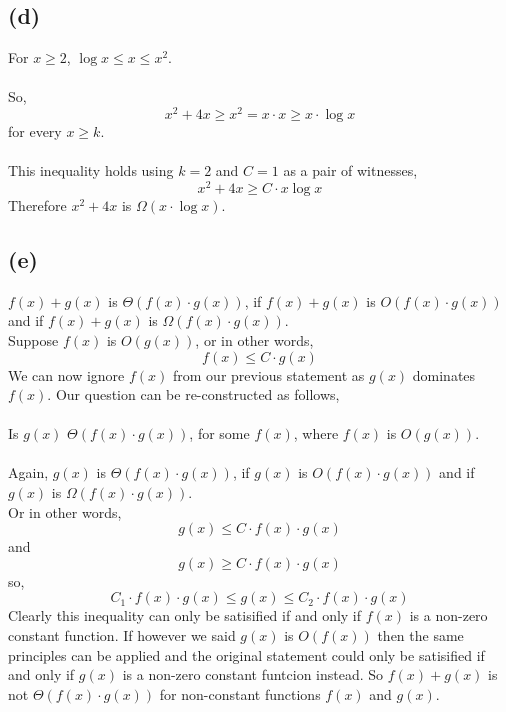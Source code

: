 \documentclass[]{article}
\begin{document}
\subsection*{(d)}
For $x \geq 2$, $\log x \leq x \leq x^2$.
\\
\\
So,
$$x^2+4x \geq x^2 = x \cdot x \geq x \cdot \log x$$
for every $x \geq k$.
\\
\\
This inequality holds using $k = 2$ and $C = 1$ as a pair of witnesses,
$$x^2+4x \geq C \cdot x \log x$$
Therefore $x^2+4x$ is $\Omega (x \cdot \log x)$.
\subsection*{(e)}
$f(x)+g(x)$ is $\Theta (f(x) \cdot g(x))$, if $f(x)+g(x)$ is $O(f(x) \cdot g(x))$ and if $f(x)+g(x)$ is $\Omega (f(x) \cdot g(x))$.
\\
Suppose $f(x)$ is $O(g(x))$, or in other words, 
$$ f(x) \leq C \cdot g(x)$$
We can now ignore $f(x)$ from our previous statement as $g(x)$ dominates $f(x)$. Our question can be re-constructed as follows,
\\
\\
Is $g(x)$ $\Theta (f(x) \cdot g(x))$, for some $f(x)$, where $f(x)$ is $O(g(x))$.
\\
\\
Again, $g(x)$ is $\Theta (f(x) \cdot g(x))$, if $g(x)$ is $O(f(x) \cdot g(x))$ and if $g(x)$ is $\Omega (f(x) \cdot g(x))$. 
\\
Or in other words,
$$g(x) \leq C \cdot f(x) \cdot g(x) $$
and
$$g(x) \geq C \cdot f(x) \cdot g(x)$$
so,
$$C_{1} \cdot f(x) \cdot g(x) \leq g(x) \leq C_{2} \cdot f(x) \cdot g(x) $$
Clearly this inequality can only be satisified if and only if $f(x)$ is a non-zero constant function. If however we said $g(x)$ is $O(f(x))$ then the same principles can be applied and the original statement could only be satisified if and only if $g(x)$ is a non-zero constant funtcion instead. So $f(x)+g(x)$ is not $\Theta (f(x) \cdot g(x))$ for non-constant functions $f(x)$ and $g(x)$.
\end{document}
